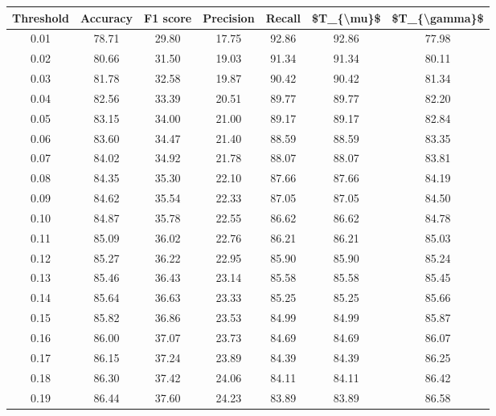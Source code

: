 \begin{tabular}{|c|c|c|c|c|c|c|}
\hline
 Threshold &  Accuracy &  F1 score &  Precision &  Recall &  \$T\_\{\textbackslash mu\}\$ &  \$T\_\{\textbackslash gamma\}\$ \\
\hline
      0.01 &     78.71 &     29.80 &      17.75 &   92.86 &      92.86 &         77.98 \\
      0.02 &     80.66 &     31.50 &      19.03 &   91.34 &      91.34 &         80.11 \\
      0.03 &     81.78 &     32.58 &      19.87 &   90.42 &      90.42 &         81.34 \\
      0.04 &     82.56 &     33.39 &      20.51 &   89.77 &      89.77 &         82.20 \\
      0.05 &     83.15 &     34.00 &      21.00 &   89.17 &      89.17 &         82.84 \\
      0.06 &     83.60 &     34.47 &      21.40 &   88.59 &      88.59 &         83.35 \\
      0.07 &     84.02 &     34.92 &      21.78 &   88.07 &      88.07 &         83.81 \\
      0.08 &     84.35 &     35.30 &      22.10 &   87.66 &      87.66 &         84.19 \\
      0.09 &     84.62 &     35.54 &      22.33 &   87.05 &      87.05 &         84.50 \\
      0.10 &     84.87 &     35.78 &      22.55 &   86.62 &      86.62 &         84.78 \\
      0.11 &     85.09 &     36.02 &      22.76 &   86.21 &      86.21 &         85.03 \\
      0.12 &     85.27 &     36.22 &      22.95 &   85.90 &      85.90 &         85.24 \\
      0.13 &     85.46 &     36.43 &      23.14 &   85.58 &      85.58 &         85.45 \\
      0.14 &     85.64 &     36.63 &      23.33 &   85.25 &      85.25 &         85.66 \\
      0.15 &     85.82 &     36.86 &      23.53 &   84.99 &      84.99 &         85.87 \\
      0.16 &     86.00 &     37.07 &      23.73 &   84.69 &      84.69 &         86.07 \\
      0.17 &     86.15 &     37.24 &      23.89 &   84.39 &      84.39 &         86.25 \\
      0.18 &     86.30 &     37.42 &      24.06 &   84.11 &      84.11 &         86.42 \\
      0.19 &     86.44 &     37.60 &      24.23 &   83.89 &      83.89 &         86.58 \\

\end{tabular}
